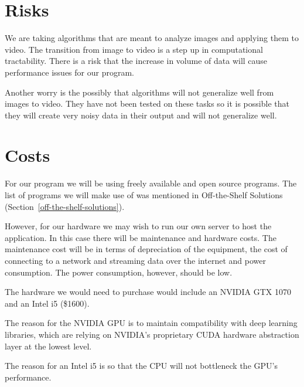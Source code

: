 \documentclass{scrreprt}
\begin{document}
\section{Risks}

{We are taking algorithms that are meant to analyze images and applying
them to video. The transition from image to video is a step up in
computational tractability. There is a risk that the increase in volume
of data will cause performance issues for our program.}

{Another worry is the possibly that algorithms will not generalize well
from images to video. They have not been tested on these tasks so it is
possible that they will create very noisy data in their output and will
not generalize well.}

\section{Costs}

{For our program we will be using freely available and open source programs.
The list of programs we will make use of was mentioned in Off-the-Shelf
Solutions (Section~\ref{off-the-shelf-solutions}).}

{However, for our hardware we may wish to run our own server to host the
application. In this case there will be maintenance and hardware costs.  The
maintenance cost will be in terms of depreciation of the equipment, the cost of
connecting to a network and streaming data over the internet and power
consumption. The power consumption, however, should be low.}

The hardware we would need to purchase would include an NVIDIA GTX 1070 and an
Intel i5 (\$1600).

The reason for the NVIDIA GPU is to maintain compatibility with deep learning
libraries, which are relying on NVIDIA's proprietary CUDA hardware abstraction
layer at the lowest level.

The reason for an Intel i5 is so that the CPU will not bottleneck the GPU's
performance.
\end{document}
